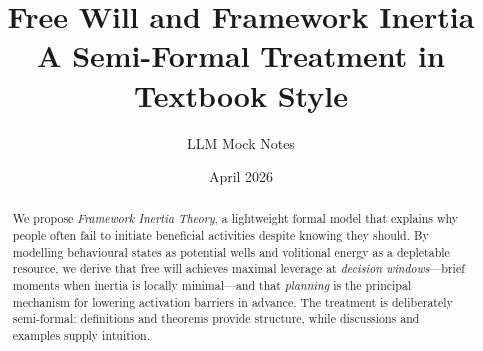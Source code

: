 %
%





\title{\textbf{Free Will and Framework Inertia}\\[6pt]
       \large A Semi-Formal Treatment in Textbook Style}
\author{LLM Mock Notes}
\date{April 2026}
\maketitle

\begin{abstract}
We propose \emph{Framework Inertia Theory}, a lightweight formal model that
explains why people often fail to initiate beneficial activities despite
knowing they should. By modelling behavioural states as potential wells and
volitional energy as a depletable resource, we derive that free will achieves
maximal leverage at \emph{decision windows}---brief moments when inertia is
locally minimal---and that \emph{planning} is the principal mechanism for
lowering activation barriers in advance. The treatment is deliberately
semi-formal: definitions and theorems provide structure, while discussions and
examples supply intuition.
\end{abstract}

\tableofcontents
\newpage




